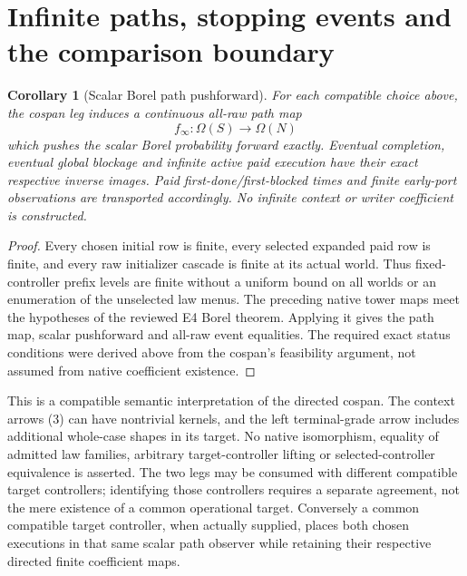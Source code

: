 \documentclass[11pt]{article}
\newtheorem{corollary}{Corollary}
\begin{document}
\section{Infinite paths, stopping events and the comparison boundary}
\begin{corollary}[Scalar Borel path pushforward]
For each compatible choice above, the cospan leg induces a continuous all-raw path map
\[
                   f_\infty:\Omega(S)\longrightarrow\Omega(N)
\]
which pushes the scalar Borel probability forward exactly. Eventual completion, eventual global blockage and infinite active paid execution have their exact respective inverse images. Paid first-done/first-blocked times and finite early-port observations are transported accordingly. No infinite context or writer coefficient is constructed.
\end{corollary}
\begin{proof}
Every chosen initial row is finite, every selected expanded paid row is finite, and every raw initializer cascade is finite at its actual world. Thus fixed-controller prefix levels are finite without a uniform bound on all worlds or an enumeration of the unselected law menus. The preceding native tower maps meet the hypotheses of the reviewed E4 Borel theorem. Applying it gives the path map, scalar pushforward and all-raw event equalities. The required exact status conditions were derived above from the cospan's feasibility argument, not assumed from native coefficient existence.\end{proof}

This is a compatible semantic interpretation of the directed cospan. The context arrows (3) can have nontrivial kernels, and the left terminal-grade arrow includes additional whole-case shapes in its target. No native isomorphism, equality of admitted law families, arbitrary target-controller lifting or selected-controller equivalence is asserted. The two legs may be consumed with different compatible target controllers; identifying those controllers requires a separate agreement, not the mere existence of a common operational target. Conversely a common compatible target controller, when actually supplied, places both chosen executions in that same scalar path observer while retaining their respective directed finite coefficient maps.
\end{document}
